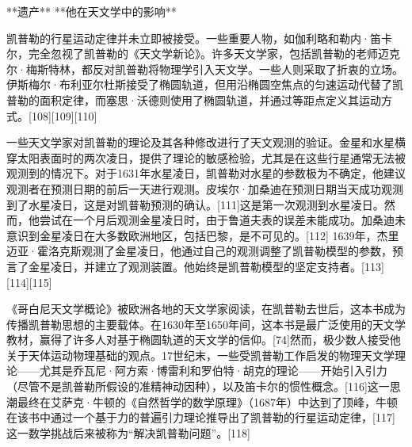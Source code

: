 **遗产**  
**他在天文学中的影响**

凯普勒的行星运动定律并未立即被接受。一些重要人物，如伽利略和勒内·笛卡尔，完全忽视了凯普勒的《天文学新论》。许多天文学家，包括凯普勒的老师迈克尔·梅斯特林，都反对凯普勒将物理学引入天文学。一些人则采取了折衷的立场。伊斯梅尔·布利亚尔杜斯接受了椭圆轨道，但用沿椭圆空焦点的匀速运动代替了凯普勒的面积定律，而塞思·沃德则使用了椭圆轨道，并通过等距点定义其运动方式。[108][109][110]

一些天文学家对凯普勒的理论及其各种修改进行了天文观测的验证。金星和水星横穿太阳表面时的两次凌日，提供了理论的敏感检验，尤其是在这些行星通常无法被观测到的情况下。对于1631年水星凌日，凯普勒对水星的参数极为不确定，他建议观测者在预测日期的前后一天进行观测。皮埃尔·加桑迪在预测日期当天成功观测到了水星凌日，这是对凯普勒预测的确认。[111]这是第一次观测到水星凌日。然而，他尝试在一个月后观测金星凌日时，由于鲁道夫表的误差未能成功。加桑迪未意识到金星凌日在大多数欧洲地区，包括巴黎，是不可见的。[112] 1639年，杰里迈亚·霍洛克斯观测了金星凌日，他通过自己的观测调整了凯普勒模型的参数，预言了金星凌日，并建立了观测装置。他始终是凯普勒模型的坚定支持者。[113][114][115]

《哥白尼天文学概论》被欧洲各地的天文学家阅读，在凯普勒去世后，这本书成为传播凯普勒思想的主要载体。在1630年至1650年间，这本书是最广泛使用的天文学教材，赢得了许多人对基于椭圆轨道的天文学的信仰。[74]然而，极少数人接受他关于天体运动物理基础的观点。17世纪末，一些受凯普勒工作启发的物理天文学理论——尤其是乔瓦尼·阿方索·博雷利和罗伯特·胡克的理论——开始引入引力（尽管不是凯普勒所假设的准精神动因种），以及笛卡尔的惯性概念。[116]这一思潮最终在艾萨克·牛顿的《自然哲学的数学原理》（1687年）中达到了顶峰，牛顿在该书中通过一个基于力的普遍引力理论推导出了凯普勒的行星运动定律，[117] 这一数学挑战后来被称为“解决凯普勒问题”。[118]